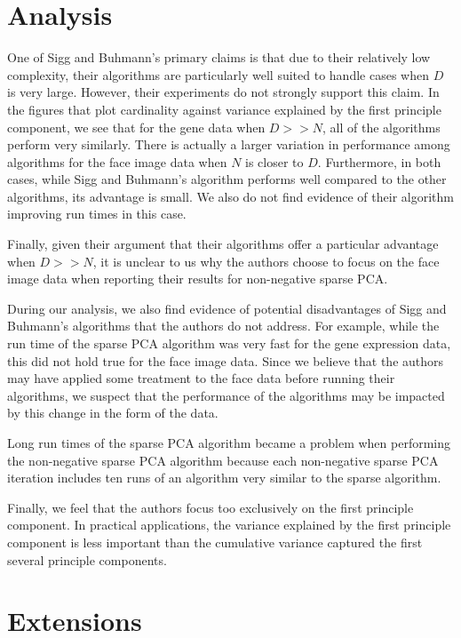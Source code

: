 \documentclass{article}
\begin{document}
\section{Analysis}

One of Sigg and Buhmann's primary claims is that due to their
relatively low complexity, their algorithms are particularly
well suited to handle cases when $D$ is very large.
However, their experiments do not strongly support this claim.
In the figures that plot cardinality against variance
explained by the first principle component, we see that for the
gene data when $D >> N$, all of the algorithms perform very
similarly. There is actually a larger variation in performance
among algorithms for the face image data when $N$ is closer to $D$.
Furthermore, in both cases, while Sigg and Buhmann's algorithm
performs well compared to the other algorithms, its advantage is small.
We also do not find evidence of their algorithm improving run times
in this case.

Finally, given their argument that their algorithms offer a particular
advantage when $D >> N$, it is unclear to us why the authors choose
to focus on the face image data when reporting their results for
non-negative sparse PCA.

During our analysis, we also find evidence of potential disadvantages
of Sigg and Buhmann's algorithms that the authors do not address.
For example, while the run time of the sparse PCA algorithm was
very fast for the gene expression data, this did not hold true for
the face image data.
Since we believe that the authors may have applied some
treatment to the face data before running their algorithms,
we suspect that the performance of the algorithms may be
impacted by this change in the form of the data.

Long run times of the sparse PCA algorithm
became a problem when performing the non-negative sparse PCA algorithm
because each non-negative sparse PCA iteration includes
ten runs of an algorithm very similar to the sparse algorithm.

Finally, we feel that the authors focus too exclusively on
the first principle component.
In practical applications, the variance explained by the first
principle component is less important than the cumulative variance
captured the first several principle components.

\section{Extensions}
\end{document}
